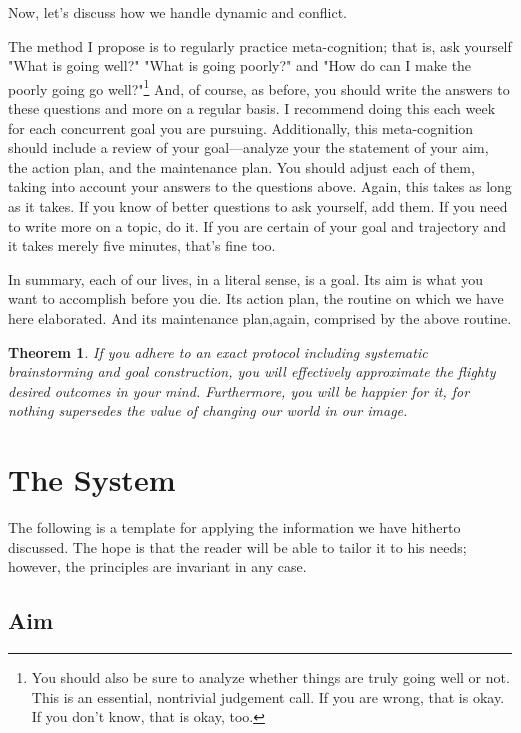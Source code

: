 \documentclass{book}
\newtheorem{thm}{Theorem}[section]
\numberwithin{equation}{section}
\begin{document}
Now, let's discuss how we handle dynamic and conflict. 

The method I propose is to regularly practice meta-cognition; that is, ask yourself "What is going well?" "What is going poorly?" and "How do can I make the poorly going go well?"\footnote{You should also be sure to analyze whether things are truly going well or not. This is an essential, nontrivial judgement call. If you are wrong, that is okay. If you don't know, that is okay, too.} And, of course, as before, you should write the answers to these questions and more on a regular basis. I recommend doing this each week for each concurrent goal you are pursuing.
Additionally, this meta-cognition should include a review of your goal---analyze your the statement of your aim, the action plan, and the maintenance plan. You should adjust each of them, taking into account your answers to the questions above. Again, this takes as long as it takes. If you know of better questions to ask yourself, add them. If you need to write more on a topic, do it. If you are certain of your goal and trajectory and it takes merely five minutes, that's fine too. 

In summary, each of our lives, in a literal sense, is a goal. Its aim is what you want to accomplish before you die. Its action plan, the routine on which we have here elaborated. And its maintenance plan,again, comprised by the above routine. 
\begin{thm}
If you adhere to an exact protocol including systematic brainstorming and goal construction, you will effectively approximate the flighty desired outcomes in your mind. Furthermore, you will be happier for it, for nothing supersedes the value of changing our world in our image.
\end{thm}
\chapter{The System}
The following is a template for applying the information we have hitherto discussed. The hope is that the reader will be able to 
tailor it to his needs; however, the principles are invariant in any case.
\section{Aim}
\end{document}
